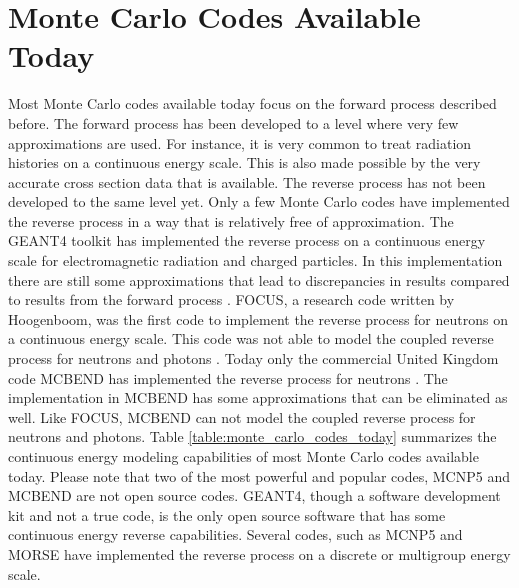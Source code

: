 \section{Monte Carlo Codes Available Today}
\label{sec:monte_carlo_codes}
Most Monte Carlo codes available today focus on the forward process described
before. The forward process has been developed to a level where very few 
approximations are used. For instance, it is very common to treat radiation
histories on a continuous energy scale. This is also made possible by the very
accurate cross section data that is available. The reverse process has not been 
developed to the same level yet. Only a few Monte Carlo codes have implemented
the reverse process in a way that is relatively free of approximation. The
GEANT4 toolkit has implemented the reverse process on a continuous energy 
scale for electromagnetic radiation and charged particles. In this implementation there are still some approximations that lead to discrepancies in results 
compared to results from the forward process 
\citep{desorgher_implementation_2010}. FOCUS, a research code written by 
Hoogenboom, was the first code to implement the reverse process for neutrons
on a continuous energy scale. This code was not able to model the coupled 
reverse process for neutrons and photons \citep{hoogenboom_adjoint_1977}. Today 
only the commercial United Kingdom code MCBEND has implemented the reverse
process for neutrons \citep{grimstone_extension_1998}. The implementation in
MCBEND has some approximations that can be eliminated as well. Like FOCUS, 
MCBEND can not model the coupled reverse process for neutrons and photons. 
Table \ref{table:monte_carlo_codes_today} summarizes the continuous energy 
modeling capabilities of most Monte Carlo codes available today. Please note 
that two of the most powerful and popular codes, MCNP5 and MCBEND are not open 
source codes. GEANT4, though a software development kit and not a true code,
is the only open source software that has some continuous energy reverse 
capabilities. Several codes, such as MCNP5 and MORSE have implemented the 
reverse process on a discrete or multigroup energy scale.

